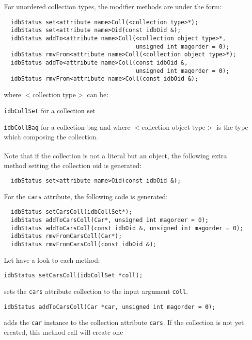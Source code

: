 For unordered collection types, the modifier methods are under the form:
\verbsize
\begin{verbatim}
  idbStatus set<attribute name>Coll(<collection type>*);
  idbStatus set<attribute name>Oid(const idbOid &);
  idbStatus addTo<attribute name>Coll(<collection object type>*,
                                      unsigned int magorder = 0);
  idbStatus rmvFrom<attribute name>Coll(<collection object type>*);
  idbStatus addTo<attribute name>Coll(const idbOid &,
                                      unsigned int magorder = 0);
  idbStatus rmvFrom<attribute name>Coll(const idbOid &);
\end{verbatim}
\normalsize
where $<$collection type$>$ can be:
\be
\item \texttt{idbCollSet} for a collection set
\item \texttt{idbCollBag} for a collection bag
\ee
and where $<$collection object type$>$ is the type which composing
the collection.
\\
\\
Note that if the collection is not a literal but an object, the following
extra method setting the collection oid is generated:
\verbsize
\begin{verbatim}
  idbStatus set<attribute name>Oid(const idbOid &);
\end{verbatim}
\normalsize
For the \texttt{cars} attribute, the following code is generated:
\verbsize
\begin{verbatim}
  idbStatus setCarsColl(idbCollSet*);
  idbStatus addToCarsColl(Car*, unsigned int magorder = 0);
  idbStatus addToCarsColl(const idbOid &, unsigned int magorder = 0);
  idbStatus rmvFromCarsColl(Car*);
  idbStatus rmvFromCarsColl(const idbOid &);
\end{verbatim}
\normalsize
Let have a look to each method:
\be
\item
\verbsize
\begin{verbatim}
idbStatus setCarsColl(idbCollSet *coll);
\end{verbatim}
\normalsize
sets the \texttt{cars} attribute collection to the input argument
\texttt{coll}.
\item
\verbsize
\begin{verbatim}
idbStatus addToCarsColl(Car *car, unsigned int magorder = 0);
\end{verbatim}
\normalsize
adds the \texttt{car} instance to the collection attribute \texttt{cars}.
If the collection is not yet created, this method call will create one
